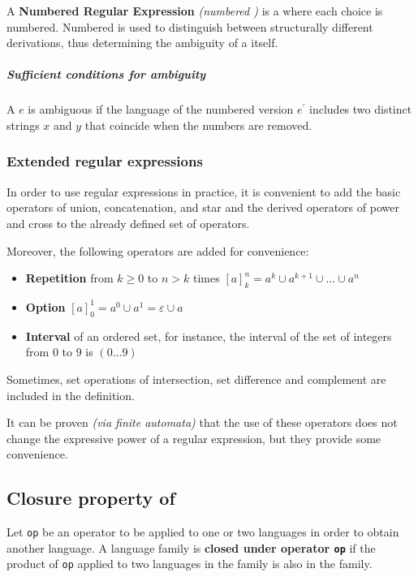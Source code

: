 \documentclass[english]{article}
\begin{document}
\begin{definition}
  A \textbf{Numbered Regular Expression} \textit{(numbered \re)} is a \re where each choice is numbered.
  Numbered \re is used to distinguish between structurally different derivations, thus determining the ambiguity of a \re itself.
\end{definition}

\subparagraph*{Sufficient conditions for ambiguity}

A \re \(e\) is ambiguous if the language of the numbered version \(e^\prime\) includes two distinct strings \(x\) and \(y\) that coincide when the numbers are removed.

\subsubsection{Extended regular expressions}

In order to use regular expressions in practice, it is convenient to add the basic operators of union, concatenation, and star and the derived operators of power and cross to the already defined set of operators.

Moreover, the following operators are added for convenience:

\begin{itemize}
  \item \textbf{Repetition} from \(k \geq 0\) to \(n > k\) times \([a]^n_k = a^k \cup a^{k+1} \cup \ldots \cup a^n\)
  \item \textbf{Option} \([a]^1_0 = a^0 \cup a^1 = \varepsilon \cup a\)
  \item \textbf{Interval} of an ordered set, for instance, the interval of the set of integers from \(0\) to \(9\) is \((0 \ldots 9)\)
\end{itemize}

Sometimes, set operations of intersection, set difference and complement are included in the definition.

\bigskip
It can be proven \textit{(via finite automata)} that the use of these operators does not change the expressive power of a regular expression, but they provide some convenience.

\subsection{Closure property of \REG}
\label{sec:closure-of-regular-expressions}

Let \texttt{op} be an operator to be applied to one or two languages in order to obtain another language.
A language family is \textbf{closed under operator \texttt{op}} if the product of \texttt{op} applied to two languages in the family is also in the family.
\end{document}
